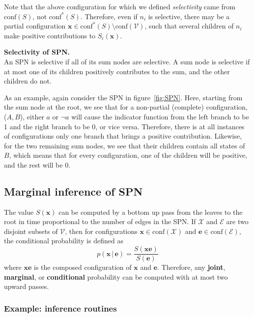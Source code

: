 \documentclass{article}
\newcommand{\giv}{\,|\,}
\begin{document}
Note that the above configuration for which we defined \textit{selectivity} came from $\text{conf}(S)$, not $\text{conf}^*(S)$. Therefore, even if $n_i$ is selective, there may be a partial configuration $\mathbf{x} \in \text{conf}^*(S) \text{\textbackslash} \text{conf}(\mathcal{V})$, such that several children of $n_i$ make positive contributions to $S_i(\mathbf{x})$. 
\\
\begin{theorem}
    \textbf{Selectivity of SPN.} \\
    An SPN is selective if all of its sum nodes are selective. A sum node is selective if at most one of its children positively contributes to the sum, and the other children do not. 
\end{theorem}

\noindent As an example, again consider the SPN in figure~\ref{fig:SPN}. Here, starting from the sum node at the root, we see that for a non-partial (complete) configuration, ($A, B$), either $a$ or $\neg a$ will cause the indicator function from the left branch to be 1 and the right branch to be 0, or vice versa. Therefore, there is at all instances of configurations only one branch that brings a positive contribution. Likewise, for the two remaining sum nodes, we see that their children contain all states of $B$, which means that for every configuration, one of the children will be positive, and the rest will be 0.

\subsection{Marginal inference of SPN}

The value $S(\mathbf{x})$ can be computed by a bottom up pass from the leaves to the root in time proportional to the number of edges in the SPN. If $\mathcal{X}$ and $\mathcal{E}$ are two disjoint subsets of $\mathcal{V}$, then for configurations $\mathbf{x} \in \text{conf}(\mathcal{X})$ and $\mathbf{e} \in \text{conf}(\mathcal{E})$, the conditional probability is defined as 
$$
    p(\mathbf{x} \giv \mathbf{e}) = \frac{S(\mathbf{xe})}{S(\mathbf{e})}
$$
\noindent where $\mathbf{xe}$ is the composed configuration of $\mathbf{x}$ and $\mathbf{e}$. Therefore, any \textbf{joint}, \textbf{marginal}, or \textbf{conditional} probability can be computed with at most two upward passes. 

\subsubsection{Example: inference routines}
\end{document}
